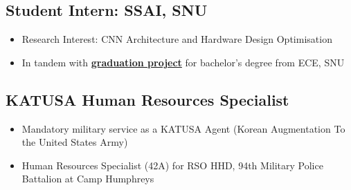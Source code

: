 \documentclass[10pt]{article}
\begin{document}
\subsection*{Student Intern: SSAI, SNU}
\begin{itemize}
  \item Research Interest: CNN Architecture and Hardware Design Optimisation
  \item In tandem with \textbf{\hyperref[edu:gradproj]{graduation project}} for
    bachelor's degree from ECE, SNU
\end{itemize}

\subsection*{KATUSA Human Resources Specialist}
\begin{itemize}
  \item Mandatory military service as a KATUSA Agent
    (Korean Augmentation To the United States Army)
  \item Human Resources Specialist (42A) for RSO HHD,
    94th Military Police Battalion at Camp Humphreys
\end{itemize}








\end{document}
